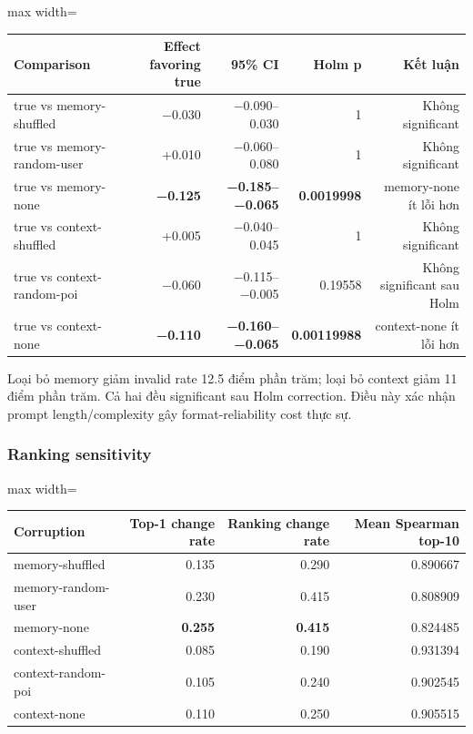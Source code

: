 \begin{table}[!htbp]
\centering
\scriptsize
\setlength{\tabcolsep}{2.5pt}
\begin{adjustbox}{max width=\textwidth}
\begin{tabular}{@{}lrrrr@{}}
\toprule
Comparison & Effect favoring true & 95\% CI & Holm p & Kết luận \\
\midrule
true vs memory-shuffled & −0.030 & −0.090--0.030 & 1 & Không significant \\
true vs memory-random-user & +0.010 & −0.060--0.080 & 1 & Không significant \\
true vs memory-none & \textbf{−0.125} & \textbf{−0.185--−0.065} & \textbf{0.0019998} & memory-none ít lỗi hơn \\
true vs context-shuffled & +0.005 & −0.040--0.045 & 1 & Không significant \\
true vs context-random-poi & −0.060 & −0.115--−0.005 & 0.19558 & Không significant sau Holm \\
true vs context-none & \textbf{−0.110} & \textbf{−0.160--−0.065} & \textbf{0.00119988} & context-none ít lỗi hơn \\
\bottomrule
\end{tabular}
\end{adjustbox}
\end{table}

Loại bỏ memory giảm invalid rate 12.5 điểm phần trăm; loại bỏ context giảm 11 điểm phần trăm. Cả hai đều significant sau Holm correction. Điều này xác nhận prompt length/complexity gây format-reliability cost thực sự.

\subsubsection*{Ranking sensitivity}

\begin{table}[!htbp]
\centering
\scriptsize
\setlength{\tabcolsep}{2.5pt}
\begin{adjustbox}{max width=\textwidth}
\begin{tabular}{@{}lrrr@{}}
\toprule
Corruption & Top-1 change rate & Ranking change rate & Mean Spearman top-10 \\
\midrule
memory-shuffled & 0.135 & 0.290 & 0.890667 \\
memory-random-user & 0.230 & 0.415 & 0.808909 \\
memory-none & \textbf{0.255} & \textbf{0.415} & 0.824485 \\
context-shuffled & 0.085 & 0.190 & 0.931394 \\
context-random-poi & 0.105 & 0.240 & 0.902545 \\
context-none & 0.110 & 0.250 & 0.905515 \\
\bottomrule
\end{tabular}
\end{adjustbox}
\end{table}

